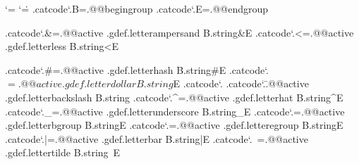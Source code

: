\unprotect

\def\@@XML            {XML:}
\def\@@XMLentity      {\@@XML ent}
\def\@@XMLelement     {\@@XML ele}
\def\@@XMLvariable    {\@@XML var}
\def\@@XMLvalue       {\@@XML val}
\def\@@XMLpars        {\@@XML par}
\def\@@XMLdata        {\@@XML dat}
\def\@@XMLcode        {\@@XML cod}
\def\@@XMLinstruction {\@@XML ins}
\def\@@XMLmap         {\@@XML map}
\def\@@XMLlist        {\@@XML lst}

\newtoks\XMLtoks
\newtoks\XMLresetlist

\chardef{}

\newif\ifignoreXMLcase
\newif\ifignoreXMLspaces
\newif\iffixedXMLfont


\let\docompound=| \def\compound#1{\docompound#1|}



\bgroup
\catcode`\*=\@@comment
\catcode`\.=\@@escape
.catcode`.B=.@@begingroup
.catcode`.E=.@@endgroup

.catcode`.&=.@@active .gdef.letterampersand  B.string&E
.catcode`.<=.@@active .gdef.letterless       B.string<E

.catcode`.#=.@@active .gdef.letterhash       B.string#E
.catcode`.$=.@@active .gdef.letterdollar     B.string$E
.catcode`.%
.catcode`.\=.@@active .gdef.letterbackslash  B.string\E
.catcode`.^=.@@active .gdef.letterhat        B.string^E
.catcode`._=.@@active .gdef.letterunderscore B.string_E
.catcode`.{=.@@active .gdef.letterbgroup     B.string{E
.catcode`.}=.@@active .gdef.letteregroup     B.string}E
.catcode`.|=.@@active .gdef.letterbar        B.string|E
.catcode`.~=.@@active .gdef.lettertilde      B.string~E

